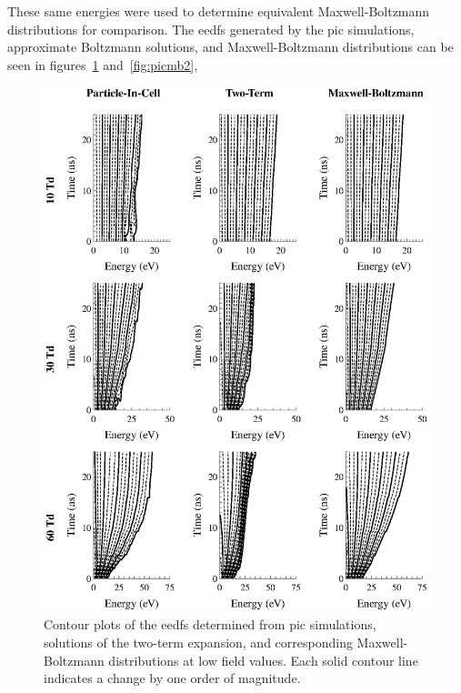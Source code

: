 These same energies were used to determine equivalent Maxwell-Boltzmann
distributions for comparison. The \acs{eedf}s generated by the \acs{pic}
simulations, approximate Boltzmann solutions, and Maxwell-Boltzmann
distributions can be seen in figures~\ref{fig:picmb1} and~\ref{fig:picmb2},
\begin{figure}
  \centering
  \includegraphics{./chapters/modeling/figures/picmb1.eps}
  \caption{Contour plots of the \acs{eedf}s determined from \acs{pic}
    simulations, solutions of the two-term expansion, and corresponding
    Maxwell-Boltzmann distributions at low field values. Each solid contour
    line indicates a change by one order of magnitude.}
  \label{fig:picmb1}
\end{figure}
